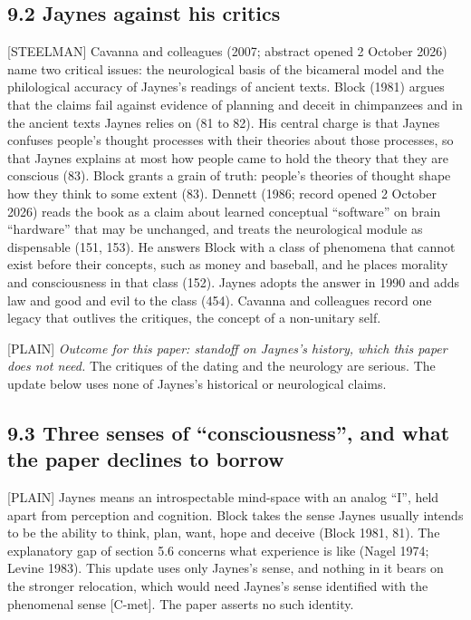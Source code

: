\documentclass[11pt]{article}
\newcommand{\register}[1]{{\ttfamily\small #1}}
\begin{document}
\subsection*{9.2 Jaynes against his critics}

\register{[STEELMAN]} Cavanna and colleagues (2007; abstract opened 2 October 2026) name two critical issues: the neurological basis of the bicameral model and the philological accuracy of Jaynes's readings of ancient texts. Block (1981) argues that the claims fail against evidence of planning and deceit in chimpanzees and in the ancient texts Jaynes relies on (81 to 82). His central charge is that Jaynes confuses people's thought processes with their theories about those processes, so that Jaynes explains at most how people came to hold the theory that they are conscious (83). Block grants a grain of truth: people's theories of thought shape how they think to some extent (83). Dennett (1986; record opened 2 October 2026) reads the book as a claim about learned conceptual ``software'' on brain ``hardware'' that may be unchanged, and treats the neurological module as dispensable (151, 153). He answers Block with a class of phenomena that cannot exist before their concepts, such as money and baseball, and he places morality and consciousness in that class (152). Jaynes adopts the answer in 1990 and adds law and good and evil to the class (454). Cavanna and colleagues record one legacy that outlives the critiques, the concept of a non-unitary self.

\register{[PLAIN]} \emph{Outcome for this paper: standoff on Jaynes's history, which this paper does not need.} The critiques of the dating and the neurology are serious. The update below uses none of Jaynes's historical or neurological claims.

\subsection*{9.3 Three senses of ``consciousness'', and what the paper declines to borrow}

\register{[PLAIN]} Jaynes means an introspectable mind-space with an analog ``I'', held apart from perception and cognition. Block takes the sense Jaynes usually intends to be the ability to think, plan, want, hope and deceive (Block 1981, 81). The explanatory gap of section 5.6 concerns what experience is like (Nagel 1974; Levine 1983). This update uses only Jaynes's sense, and nothing in it bears on the stronger relocation, which would need Jaynes's sense identified with the phenomenal sense [C-met]. The paper asserts no such identity.
\end{document}
